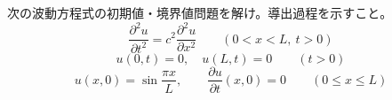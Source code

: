 
次の波動方程式の初期値・境界値問題を解け。導出過程を示すこと。
\[
\frac{\partial^{2} u}{\partial t^{2}} = c^{2}\frac{\partial^{2} u}{\partial x^{2}} \qquad (0 < x < L,\ t > 0)
\]
\[
u(0,t) = 0,\quad u(L,t) = 0 \qquad (t > 0)
\]
\[
u(x,0) = \sin\frac{\pi x}{L}, \qquad \frac{\partial u}{\partial t}(x,0) = 0 \qquad (0 \le x \le L)
\]
